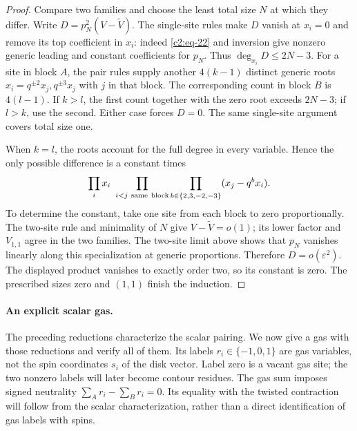 \begin{proof}
Compare two families and choose the least total size \(N\) at which
they differ. Write \(D=p_N^2(V-\widetilde V)\). The single-site rules
make \(D\) vanish at \(x_i=0\) and remove its top coefficient in \(x_i\):
indeed \eqref{c2:eq-22} and inversion give nonzero generic leading and
constant coefficients for \(p_N\). Thus
\(\deg_{x_i}D\le2N-3\). For a site in block \(A\), the pair rules
supply another \(4(k-1)\) distinct generic roots
\(x_i=q^{\pm2}x_j,q^{\pm3}x_j\) with \(j\) in that block.
The corresponding count in block \(B\) is \(4(l-1)\).
If \(k>l\), the first count together with the zero root exceeds
\(2N-3\); if \(l>k\), use the second. Either case forces \(D=0\).
The same single-site argument covers total size one.

When \(k=l\), the roots account for the full degree in every variable.
Hence the only possible difference is a constant times
\[
 \prod_i x_i\ \prod_{i<j\ {\rm same\ block}}
 \prod_{b\in\{2,3,-2,-3\}}(x_j-q^b x_i).
\]
To determine the constant, take one site from each block to zero
proportionally. The two-site rule and minimality of \(N\) give
\(V-\widetilde V=o(1)\); its lower factor and \(V_{1,1}\) agree in
the two families. The two-site limit above shows that \(p_N\) vanishes
linearly along this specialization at generic proportions. Therefore
\(D=o(\varepsilon^2)\). The displayed product vanishes to exactly
order two, so its constant is zero. The prescribed sizes zero and
\((1,1)\) finish the induction.
\end{proof}

\paragraph{An explicit scalar gas.}
The preceding reductions characterize the scalar pairing. We now give
a gas with those reductions and verify all of them. Its labels
\(r_i\in\{-1,0,1\}\) are gas variables, not the spin coordinates
\(s_i\) of the disk vector. Label zero is a vacant gas site; the two
nonzero labels will later become contour residues. The gas sum imposes signed neutrality
\(\sum_A r_i-\sum_B r_i=0\). Its equality with the twisted contraction
will follow from the scalar characterization, rather than a direct
identification of gas labels with spins.

